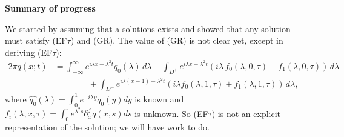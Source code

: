 \bigskip

{\large \bf Summary of progress}

\bigskip

We started by assuming that a solutions exists and showed that any solution must satisfy (EF$\tau$) and (GR). The value of (GR) is not clear yet, except in deriving (EF$\tau$):
\begin{equation*}
\begin{aligned}
2\pi q(x;t) &= \int_{-\infty}^\infty e^{i\lambda x - \lambda^2 t}\widehat{q_0}(\lambda)\,d\lambda - \int_{D^+} e^{i\lambda x - \lambda^2 t}(i\lambda\,f_0(\lambda,0,\tau)+f_1(\lambda,0,\tau))\,d\lambda \\
  &\qquad \qquad + \int_{D^-} e^{i\lambda(x-1)-\lambda^2t}(i\lambda f_0(\lambda,1,\tau) + f_1(\lambda,1,\tau))\,d\lambda,
\end{aligned}
\end{equation*}
where $\widehat{q_0}(\lambda) = \int_0^1e^{-i\lambda y}q_0(y)dy$ is known and $f_i(\lambda,x,\tau) = \int_0^\tau e^{\lambda^2s}\partial_x^jq(x,s)ds$ is unknown. So (EF$\tau$) is not an explicit representation of the solution; we will have work to do.